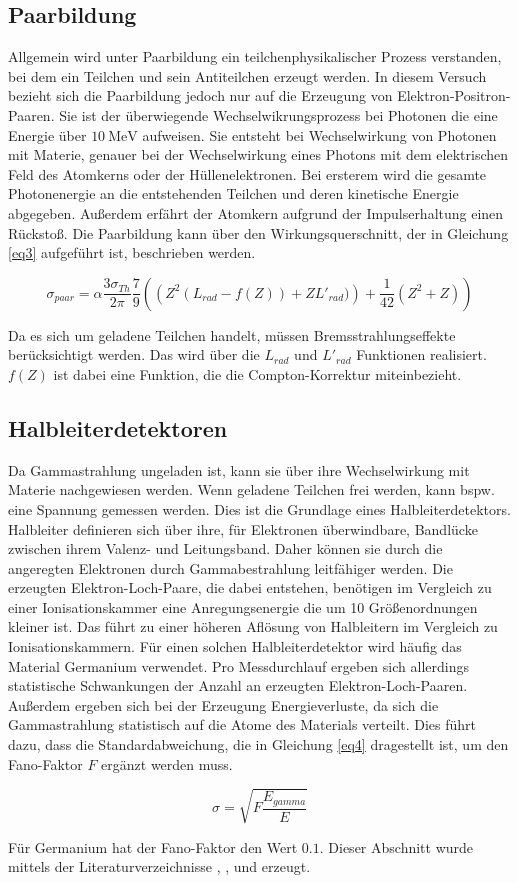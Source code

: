 \subsection{Paarbildung}
Allgemein wird unter Paarbildung ein teilchenphysikalischer Prozess verstanden, bei dem 
ein Teilchen und sein Antiteilchen erzeugt werden. In diesem Versuch bezieht sich die 
Paarbildung jedoch nur auf die Erzeugung von Elektron-Positron-Paaren. 
Sie ist der überwiegende Wechselwikrungsprozess bei Photonen die eine Energie
über $\SI{10}{\mega\electronvolt}$ aufweisen.
Sie entsteht bei Wechselwirkung von Photonen mit Materie, genauer bei der 
Wechselwirkung eines Photons mit dem elektrischen Feld des Atomkerns oder der 
Hüllenelektronen. 
Bei ersterem wird die gesamte Photonenergie an die 
entstehenden Teilchen und deren kinetische Energie abgegeben. Außerdem erfährt 
der Atomkern aufgrund der Impulserhaltung einen Rückstoß.
Die Paarbildung kann über den 
Wirkungsquerschnitt, der in Gleichung \ref{eq3} aufgeführt ist, beschrieben werden.

\begin{equation}
    \sigma_{paar} = \alpha \frac{3 \sigma_{Th}}{2 \pi} \frac{7}{9} \left( \left( Z^2 (L_{rad} - f(Z)) + Z L'_{rad}) \right) + \frac{1}{42} \left(Z^2 + Z \right) \right)
    \label{eq3}
\end{equation}

Da es sich um geladene Teilchen handelt, müssen Bremsstrahlungseffekte berücksichtigt 
werden. Das wird über die $L_{rad}$ und $L'_{rad}$ Funktionen realisiert. 
$f(Z)$ ist dabei eine Funktion, die die Compton-Korrektur miteinbezieht.

\subsection{Halbleiterdetektoren}
Da Gammastrahlung ungeladen ist, kann sie über ihre Wechselwirkung mit Materie 
nachgewiesen werden. Wenn geladene Teilchen frei werden, kann bspw. eine 
Spannung gemessen werden. Dies ist die Grundlage eines Halbleiterdetektors.
Halbleiter definieren sich über ihre, für Elektronen überwindbare,
Bandlücke zwischen ihrem Valenz- und Leitungsband. Daher können sie durch die 
angeregten Elektronen durch Gammabestrahlung leitfähiger werden. 
Die erzeugten Elektron-Loch-Paare, die dabei entstehen, benötigen im Vergleich zu einer 
Ionisationskammer eine Anregungsenergie die um 10 Größenordnungen kleiner ist. 
Das führt zu einer höheren Aflösung von Halbleitern im Vergleich zu Ionisationskammern.
Für einen solchen Halbleiterdetektor wird häufig das Material Germanium verwendet.
Pro Messdurchlauf ergeben sich allerdings statistische Schwankungen der Anzahl an 
erzeugten Elektron-Loch-Paaren. Außerdem ergeben sich bei der Erzeugung Energieverluste,
da sich die Gammastrahlung statistisch auf die Atome des Materials verteilt.
Dies führt dazu, dass die Standardabweichung, die in Gleichung \ref{eq4} dragestellt ist,
um den Fano-Faktor $F$ ergänzt werden muss.

\begin{equation}
    \sigma = \sqrt{F \frac{E_{gamma}}{E}}
    \label{eq4}
\end{equation}

Für Germanium hat der Fano-Faktor den Wert $\num{0,1}$.
Dieser Abschnitt wurde mittels der Literaturverzeichnisse \cite{lit1},
\cite{lit2}, \cite{lit3} und \cite{lit4} erzeugt.
